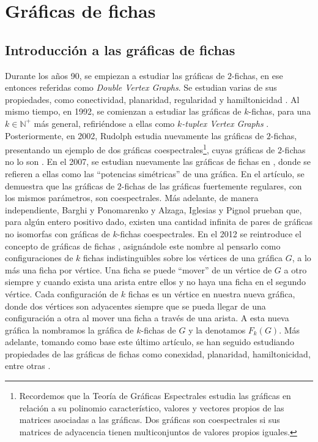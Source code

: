\chapter{Gr\'aficas de fichas}%
\label{cap:fichass}

\section{Introducci\'on a las gr\'aficas de fichas}%
\label{sec:intro-fichas}


Durante los a\~{n}os 90, se empiezan a estudiar las gr\'aficas de $2$-fichas, en
ese entonces referidas como \textit{Double Vertex Graphs}. Se estudian varias de
sus propiedades, como conectividad, planaridad, regularidad y hamiltonicidad
\cite{alaviPlanarity, alaviDVGraphs, alaviHamilt, zhuConnect}. Al mismo tiempo,
en 1992, se comienzan a estudiar las gr\'aficas de $k$-fichas, para una $k \in
\mathbb{N^{+}}$ m\'as general, refiri\'endose a ellas como \textit{$k$-tuplex
Vertex Graphs} \cite{zhuNTuples}. Posteriormente, en 2002, Rudolph estudia
nuevamente las gr\'aficas de $2$-fichas, presentando un ejemplo de dos
gr\'aficas coespectrales\footnote{Recordemos que la Teor\'ia de Gr\'aficas
Espectrales estudia las gr\'aficas en relaci\'on a su polinomio
caracter\'istico, valores y vectores propios de las matrices asociadas a las
gr\'aficas. Dos gr\'aficas son coespectrales si sus matrices de adyacencia
tienen multiconjuntos de valores propios iguales.}, cuyas gr\'aficas de
$2$-fichas no lo son \cite{rudolphGInv}. En el 2007, se estudian nuevamente las
gr\'aficas de fichas en \cite{audeanetSymPower}, donde se refieren a ellas como
las ``potencias sim\'etricas'' de una gr\'afica. En el art\'iculo, se demuestra
que las gr\'aficas de $2$-fichas de las gr\'aficas fuertemente regulares, con
los mismos par\'ametros, son coespectrales. M\'as adelante, de manera
independiente, Barghi y Ponomarenko \cite{barghi-ponomarenko} y Alzaga, Iglesias
y Pignol \cite{alzagaSymPower} prueban que, para alg\'un entero positivo dado,
existen una cantidad infinita de pares de gr\'aficas no isomorfas con gr\'aficas
de $k$-fichas coespectrales. En el 2012 se reintroduce el concepto de gr\'aficas
de fichas \cite{fabilaToken}, asign\'andole este nombre al pensarlo como
configuraciones de $k$ fichas indistinguibles sobre los v\'ertices de una
gr\'afica $G$, a lo m\'as una ficha por v\'ertice. Una ficha se puede ``mover''
de un v\'ertice de $G$ a otro siempre y cuando exista una arista entre ellos y
no haya una ficha en el segundo v\'ertice. Cada configuraci\'on de $k$ fichas es
un v\'ertice en nuestra nueva gr\'afica, donde dos v\'ertices son adyacentes
siempre que se pueda llegar de una configuraci\'on a otra al mover una ficha a
trav\'es de una arista. A esta nueva gr\'afica la nombramos la gr\'afica de
$k$-fichas de $G$ y la denotamos $F_k(G)$. M\'as adelante, tomando como base
este \'ultimo art\'iculo, se han seguido estudiando propiedades de las
gr\'aficas de fichas como conexidad, planaridad, hamiltonicidad, entre otras
\cite{carballosaRegPlan, leaConnect, riveraHamilt, adameHamilt, leaEConnect}.


